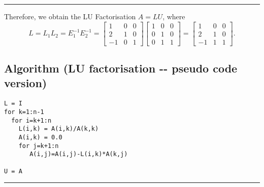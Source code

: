 \documentclass[11pt]{article}
\begin{document}
\begin{center}\rule{0.5\linewidth}{\linethickness}\end{center}

Therefore, we obtain the LU Factorisation \(A = L U\), where
\[L=L_1 L_2 = E_1^{-1} E_2^{-1} =
\left[\begin{array}{rrr}1&0&0\\2&1&0\\-1&0&1\end{array}\right]
\left[\begin{array}{rrr}1&0&0\\0&1&0\\0&1&1\end{array}\right]
=\left[\begin{array}{rrr}
1 & 0 & 0\\
{2} & 1 & 0\\
{-1} & {1} & 1\end{array}\right].\]

    \subsection{Algorithm (LU factorisation -\/- pseudo code
version)}\label{algorithm-lu-factorisation----pseudo-code-version}

\begin{verbatim}
L = I
for k=1:n-1
  for i=k+1:n
    L(i,k) = A(i,k)/A(k,k)
    A(i,k) = 0.0
    for j=k+1:n
       A(i,j)=A(i,j)-L(i,k)*A(k,j)

U = A
\end{verbatim}

\begin{center}\rule{0.5\linewidth}{\linethickness}\end{center}
\end{document}
